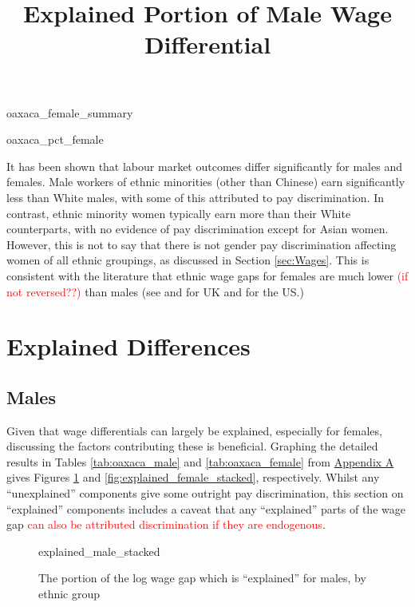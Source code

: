 \documentclass[class=article, crop=false]{standalone}
\begin{document}
{oaxaca_female_summary}

{oaxaca_pct_female}

It has been shown that labour market outcomes differ significantly for males and females. Male workers of ethnic minorities (other than Chinese) earn significantly less than White males, with some of this attributed to pay discrimination. In contrast, ethnic minority women typically earn more than their White counterparts, with no evidence of pay discrimination except for Asian women. However, this is not to say that there is not gender pay discrimination affecting women of all ethnic groupings, as discussed in Section \ref{sec:Wages}. This is consistent with the literature that ethnic wage gaps for females are much lower \textcolor{red}{(if not reversed??)} than males (see \citet{ONSe} and \citet{Longhi3} for UK and \citet{Bayard} for the US.) %


\section{Explained Differences}
\label{sec:explained_diff}
\subsection{Males}
\label{sec:male_explained}
Given that wage differentials can largely be explained, especially for females, discussing the factors contributing these is beneficial. Graphing the detailed results in Tables \ref{tab:oaxaca_male} and \ref{tab:oaxaca_female} from \hyperref[sec:appendixA]{Appendix A} gives Figures \ref{fig:explained_male_stacked} and \ref{fig:explained_female_stacked}, respectively. Whilst any \enquote{unexplained} components give some outright pay discrimination, this section on \enquote{explained} components includes a caveat that any \enquote{explained} parts of the wage gap \textcolor{red}{can also be attributed discrimination if they are endogenous}.

\begin{figure}[h]
\centering
    \title{Explained Portion of Male Wage Differential}
    {explained_male_stacked}
    \caption{The portion of the log wage gap which is \enquote{explained} for males, by ethnic group}
    \label{fig:explained_male_stacked}
\end{figure}
\end{document}
